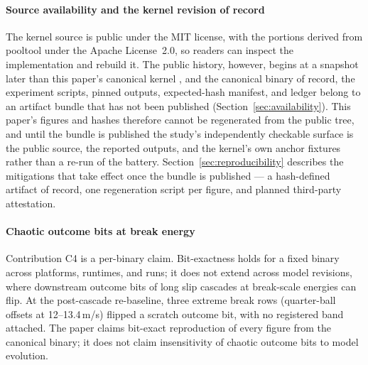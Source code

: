 \paragraph{Source availability and the kernel revision of record}
The kernel source is public under the MIT license, with the portions
derived from pooltool under the Apache License~2.0, so readers can
inspect the implementation and rebuild it. The public history, however,
begins at a snapshot later than this paper's canonical kernel
, and the canonical binary of record, the experiment
scripts, pinned outputs, expected-hash manifest, and ledger belong to an
artifact bundle that has not been published
(Section~\ref{sec:availability}). This paper's
figures and hashes therefore cannot be regenerated from the public tree,
and until the bundle is published the study's independently checkable
surface is the public source, the reported outputs, and the kernel's own
anchor fixtures rather than a re-run of the battery.
Section~\ref{sec:reproducibility} describes the mitigations that take
effect once the bundle is published --- a hash-defined artifact of
record, one regeneration script per figure, and planned third-party
attestation.

\paragraph{Chaotic outcome bits at break energy}
Contribution C4 is a per-binary claim. Bit-exactness holds for a fixed
binary across platforms, runtimes, and runs; it does not extend across
model revisions, where downstream outcome bits of long slip cascades at
break-scale energies can flip. At the post-cascade re-baseline, three
extreme break rows (quarter-ball offsets at 12--13.4\,m/s) flipped a
scratch outcome bit, with no registered band attached. The paper claims
bit-exact reproduction of every figure from the canonical binary; it does
not claim insensitivity of chaotic outcome bits to model evolution.
